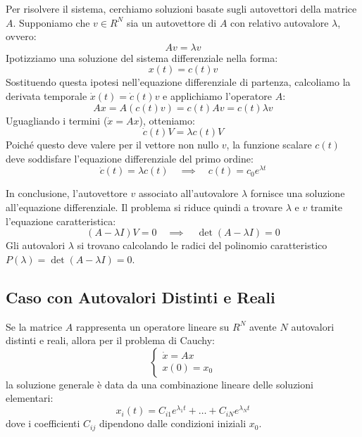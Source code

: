 \documentclass[openany]{book}
\theoremstyle{definition}
\theoremstyle{remark}
\begin{document}
Per risolvere il sistema, cerchiamo soluzioni basate sugli autovettori della matrice $A$. Supponiamo che $v \in R^N$ sia un autovettore di $A$ con relativo autovalore $\lambda$, ovvero:
\begin{equation}
    Av = \lambda v
\end{equation}
Ipotizziamo una soluzione del sistema differenziale nella forma:
\begin{equation}
    x(t) = c(t)v
\end{equation}
Sostituendo questa ipotesi nell'equazione differenziale di partenza, calcoliamo la derivata temporale $\dot{x}(t) = \dot{c}(t)v$ e applichiamo l'operatore $A$:
\begin{equation}
    Ax = A(c(t)v) = c(t)Av = c(t)\lambda v
\end{equation}
Uguagliando i termini ($\dot{x} = Ax$), otteniamo:
\begin{equation}
    \dot{c}(t)V = \lambda c(t)V
\end{equation}
Poiché questo deve valere per il vettore non nullo $v$, la funzione scalare $c(t)$ deve soddisfare l'equazione differenziale del primo ordine:
\begin{equation}
    \dot{c}(t) = \lambda c(t) \quad \implies \quad c(t) = c_0 e^{\lambda t}
\end{equation}

In conclusione, l'autovettore $v$ associato all'autovalore $\lambda$ fornisce una soluzione all'equazione differenziale. Il problema si riduce quindi a trovare $\lambda$ e $v$ tramite l'equazione caratteristica:
\begin{equation}
    (A - \lambda I)V = 0 \quad \implies \quad \det(A - \lambda I) = 0
\end{equation}
Gli autovalori $\lambda$ si trovano calcolando le radici del polinomio caratteristico $P(\lambda) = \det(A - \lambda I) = 0$.

\subsection{Caso con Autovalori Distinti e Reali}

Se la matrice $A$ rappresenta un operatore lineare su $R^N$ avente $N$ autovalori distinti e reali, allora per il problema di Cauchy:
\begin{equation}
    \begin{cases}
        \dot{x} = Ax \\
        x(0) = x_0
    \end{cases}
\end{equation}
la soluzione generale è data da una combinazione lineare delle soluzioni elementari:
\begin{equation}
    x_i(t) = C_{i1} e^{\lambda_1 t} + \dots + C_{iN} e^{\lambda_N t}
\end{equation}
dove i coefficienti $C_{ij}$ dipendono dalle condizioni iniziali $x_0$.
\end{document}
